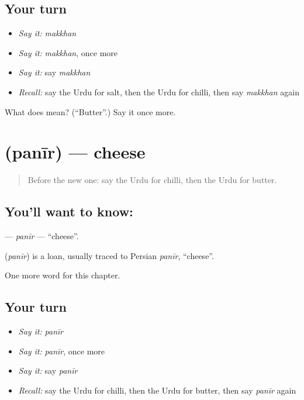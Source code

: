 \subsection*{Your turn}
\begin{itemize}
\raggedright
  \item \emph{Say it:} \emph{makkhan}
  \item \emph{Say it:} \emph{makkhan}, once more
  \item \emph{Say it:} say \emph{makkhan}
  \item \emph{Recall:} say the Urdu for salt, then the Urdu for chilli, then say \emph{makkhan} again
\end{itemize}

\begin{tcolorbox}[breakable,colback=teal!4,colframe=teal!35!black,title={Before you move on}]
What does  mean? (\textquotedblleft{}Butter\textquotedblright{}.) Say it once more.
\end{tcolorbox}
\section[\texorpdfstring{\ur{پنیر} (panīr)}{پنیر (panīr)}]{ (panīr) — cheese}

\label{lesson:UR-C56-panir}



\begin{quote}
Before the new one: say the Urdu for chilli, then the Urdu for butter.
\end{quote}

\subsection*{You'll want to know: }
\textbf{} — \emph{panīr} — \textquotedblleft{}cheese\textquotedblright{}.

\begin{cousinweb}
\textbf{} (\emph{panīr}) is a loan, usually traced to Persian \emph{panīr}, \textquotedblleft{}cheese\textquotedblright{}.
\end{cousinweb}

\begin{grammarlens}[title={What you've built}]
One more word for this chapter.
\end{grammarlens}

\subsection*{Your turn}
\begin{itemize}
\raggedright
  \item \emph{Say it:} \emph{panīr}
  \item \emph{Say it:} \emph{panīr}, once more
  \item \emph{Say it:} say \emph{panīr}
  \item \emph{Recall:} say the Urdu for chilli, then the Urdu for butter, then say \emph{panīr} again
\end{itemize}

